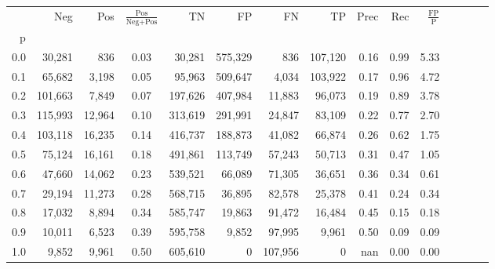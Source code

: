 \begin{tabular}{rrrcrrrrrrrrrrr}
\toprule
{} &      Neg &     Pos & $\frac{\text{Pos}}{\text{Neg}+\text{Pos}}$ &       TN &       FP &       FN &       TP &  Prec &   Rec & $\frac{\text{FP}}{\text{P}}$ \\
p   &          &         &                                            &          &          &          &          &       &       &                              \\
\midrule
0.0 &   30,281 &     836 &                                       0.03 &   30,281 &  575,329 &      836 &  107,120 &  0.16 &  0.99 &                         5.33 \\
0.1 &   65,682 &   3,198 &                                       0.05 &   95,963 &  509,647 &    4,034 &  103,922 &  0.17 &  0.96 &                         4.72 \\
0.2 &  101,663 &   7,849 &                                       0.07 &  197,626 &  407,984 &   11,883 &   96,073 &  0.19 &  0.89 &                         3.78 \\
0.3 &  115,993 &  12,964 &                                       0.10 &  313,619 &  291,991 &   24,847 &   83,109 &  0.22 &  0.77 &                         2.70 \\
0.4 &  103,118 &  16,235 &                                       0.14 &  416,737 &  188,873 &   41,082 &   66,874 &  0.26 &  0.62 &                         1.75 \\
0.5 &   75,124 &  16,161 &                                       0.18 &  491,861 &  113,749 &   57,243 &   50,713 &  0.31 &  0.47 &                         1.05 \\
0.6 &   47,660 &  14,062 &                                       0.23 &  539,521 &   66,089 &   71,305 &   36,651 &  0.36 &  0.34 &                         0.61 \\
0.7 &   29,194 &  11,273 &                                       0.28 &  568,715 &   36,895 &   82,578 &   25,378 &  0.41 &  0.24 &                         0.34 \\
0.8 &   17,032 &   8,894 &                                       0.34 &  585,747 &   19,863 &   91,472 &   16,484 &  0.45 &  0.15 &                         0.18 \\
0.9 &   10,011 &   6,523 &                                       0.39 &  595,758 &    9,852 &   97,995 &    9,961 &  0.50 &  0.09 &                         0.09 \\
1.0 &    9,852 &   9,961 &                                       0.50 &  605,610 &        0 &  107,956 &        0 &   nan &  0.00 &                         0.00 \\
\bottomrule
\end{tabular}
